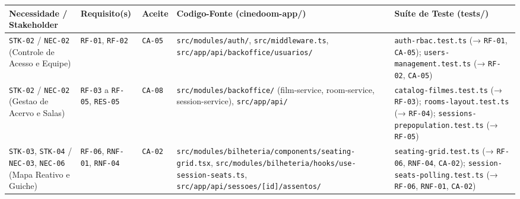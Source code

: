 %
%

\begin{center}
\small
\setlength{\tabcolsep}{4pt}
\renewcommand{\arraystretch}{1.15}
\begin{tabularx}{\textwidth}{>{\raggedright\arraybackslash}m{2.6cm} >{\raggedright\arraybackslash}m{1.7cm} >{\raggedright\arraybackslash}m{1.3cm} >{\raggedright\arraybackslash}m{4.0cm} Y}
\toprule
{}
\textbf{Necessidade / Stakeholder} & \textbf{Requisito(s)} & \textbf{Aceite} & \textbf{Codigo-Fonte (cinedoom-app/)} & \textbf{Suíte de Teste (tests/)} \\
\midrule
{}
\texttt{STK-02} / \texttt{NEC-02} (Controle de Acesso e Equipe) & \texttt{RF-01}, \texttt{RF-02} & \texttt{CA-05} & \texttt{src/modules/auth/}, \texttt{src/middleware.ts}, \texttt{src/app/api/backoffice/usuarios/} & \texttt{auth-rbac.test.ts} (→ \texttt{RF-01}, \texttt{CA-05}); \texttt{users-management.test.ts} (→ \texttt{RF-02}, \texttt{CA-05}) \\
\midrule
\texttt{STK-02} / \texttt{NEC-02} (Gestao de Acervo e Salas) & \texttt{RF-03} a \texttt{RF-05}, \texttt{RES-05} & \texttt{CA-08} & \texttt{src/modules/backoffice/} (film-service, room-service, session-service), \texttt{src/app/api/} & \texttt{catalog-filmes.test.ts} (→ \texttt{RF-03}); \texttt{rooms-layout.test.ts} (→ \texttt{RF-04}); \texttt{sessions-prepopulation.test.ts} (→ \texttt{RF-05}) \\
\midrule
\texttt{STK-03}, \texttt{STK-04} / \texttt{NEC-03}, \texttt{NEC-06} (Mapa Reativo e Guiche) & \texttt{RF-06}, \texttt{RNF-01}, \texttt{RNF-04} & \texttt{CA-02} & \texttt{src/modules/bilheteria/components/seating-grid.tsx}, \texttt{src/modules/bilheteria/hooks/use-session-seats.ts}, \texttt{src/app/api/sessoes/[id]/assentos/} & \texttt{seating-grid.test.ts} (→ \texttt{RF-06}, \texttt{RNF-04}, \texttt{CA-02}); \texttt{session-seats-polling.test.ts} (→ \texttt{RF-06}, \texttt{RNF-01}, \texttt{CA-02}) \\

\end{tabularx}
\end{center}
